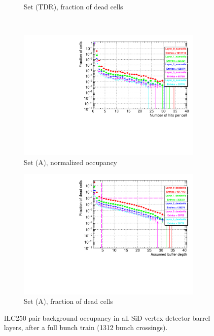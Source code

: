 \begin{figure}[htbp]
\begin{subfigure}[b]{0.49\textwidth}
   \caption{Set (TDR), fraction of dead cells}
   \end{subfigure}\\
  \begin{subfigure}[b]{0.49\textwidth}
   \centering
    \includegraphics[width=\textwidth]{Figures/Pairs/Appendix/occupancy_numcells_SiVertexBarrel_ILC250_SetA_corrected_Barrel_size.pdf}
   \caption{Set (A), normalized occupancy}
   \end{subfigure}
   \hfill
    \begin{subfigure}[b]{0.49\textwidth}
   \centering
    \includegraphics[width=\textwidth]{Figures/Pairs/Appendix/occupancy_deadcells_SiVertexBarrel_ILC250_SetA_corrected_Barrel_size.pdf}
   \caption{Set (A), fraction of dead cells}
   \end{subfigure}
      \caption[Pair background occupancy in all SiD vertex detector barrel layers for the ILC250]{ILC250 pair background occupancy in all SiD vertex detector barrel layers, after a full bunch train (1312 bunch crossings).
}
\end{figure}
